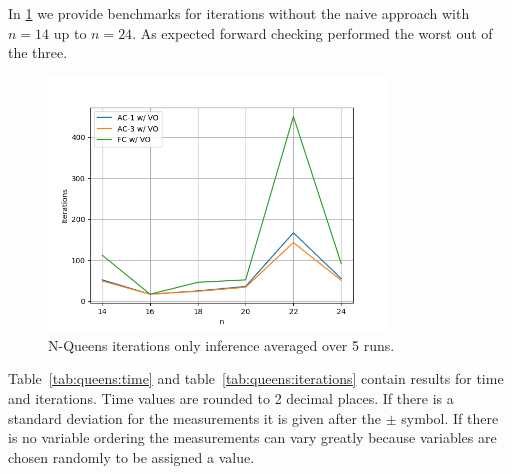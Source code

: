 In \cref{fig:queens:iterations-inference} we provide benchmarks for iterations without the naive approach with $n = 14$ up to $n = 24$. As expected forward checking performed the worst out of the three.

\begin{figure}[ht]
	\centering
	\includegraphics[width=0.8\textwidth]{./Problems/queens/plots/iterations_inference.png}
	\caption{N-Queens iterations only inference averaged over 5 runs.}
	\label{fig:queens:iterations-inference}
\end{figure}

Table~\ref{tab:queens:time} and table~\ref{tab:queens:iterations} contain results for time and iterations. Time values are rounded to 2 decimal places. If there is a standard deviation for the measurements it is given after the $\pm$ symbol. If there is no variable ordering the measurements can vary greatly because variables are chosen randomly to be assigned a value.

